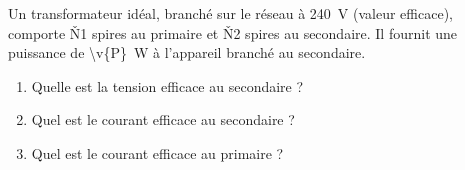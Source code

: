 Un transformateur idéal, branché sur le réseau à \qty{240}{V} (valeur efficace), comporte \v{N1} spires au primaire et \v{N2} spires au secondaire. Il fournit une puissance de \qty{\v{P}}{W} à l'appareil branché au secondaire.

\begin{enumerate}[label=\alph*)]
    \item Quelle est la tension efficace au secondaire ?
    \item Quel est le courant efficace au secondaire ?
    \item Quel est le courant efficace au primaire ?
\end{enumerate}
